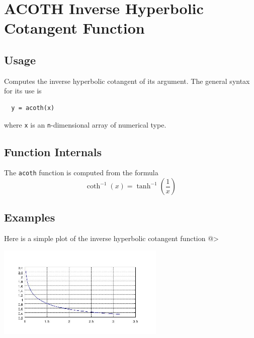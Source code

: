 \section{ACOTH Inverse Hyperbolic Cotangent Function}

\subsection{Usage}

Computes the inverse hyperbolic cotangent of its argument.  The general
syntax for its use is
\begin{verbatim}
  y = acoth(x)
\end{verbatim}
where \verb|x| is an \verb|n|-dimensional array of numerical type.
\subsection{Function Internals}

The \verb|acoth| function is computed from the formula
\[
   \coth^{-1}(x) = \tanh^{-1}\left(\frac{1}{x}\right)
\]
\subsection{Examples}

Here is a simple plot of the inverse hyperbolic cotangent function
@>


\centerline{\includegraphics[width=8cm]{acothplot}}


